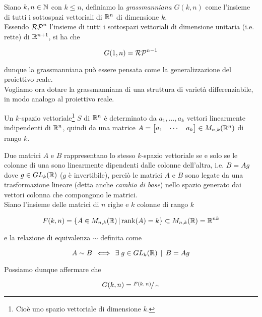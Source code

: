 Siano $ k,n \in \mathbb{N} $ con $ k \leqslant n $, definiamo la \textit{grassmanniana} $ G(k,n) $ come l'insieme di tutti i sottospazi vettoriali di $ \mathbb{R}^{n} $ di dimensione $ k $.\\
Essendo $ \mathcal{RP}^{n} $ l'insieme di tutti i sottospazi vettoriali di dimensione unitaria (i.e. rette) di $ \mathbb{R}^{n+1} $, si ha che

\begin{equation}
	G(1,n) = \mathcal{RP}^{n-1}
\end{equation}

dunque la grassmanniana può essere pensata come la generalizzazione del proiettivo reale.\\
Vogliamo ora dotare la grassmanniana di una struttura di varietà differenziabile, in modo analogo al proiettivo reale.

\begin{remark}
	Un $ k $-spazio vettoriale\footnote{%
		Cioè uno spazio vettoriale di dimensione $ k $.%
	} $ S $ di $ \mathbb{R}^{n} $ è determinato da $ a_{1},\dots,a_{k} $ vettori linearmente indipendenti di $ \mathbb{R}^{n} $, quindi da una matrice $ A = \bmqty{ a_{1} & \cdots & a_{k} } \in M_{n,k}(\R^{n}) $ di rango $ k $.
\end{remark}

Due matrici $ A $ e $ B $ rappresentano lo stesso $ k $-spazio vettoriale se e solo se le colonne di una sono linearmente dipendenti dalle colonne dell'altra, i.e. $ B = A g $ dove $ g \in GL_{k}(\mathbb{R}) $ ($ g $ è invertibile), perciò le matrici $ A $ e $ B $ sono legate da una trasformazione lineare (detta anche \textit{cambio di base}) nello spazio generato dai vettori colonna che compongono le matrici.\\
Siano l'insieme delle matrici di $ n $ righe e $ k $ colonne di rango $ k $

\begin{equation}
	F(k,n) = \left\{ A \in M_{n,k}(\mathbb{R}) \, \middle| \, \rank(A) = k \right\} \subset M_{n,k}(\mathbb{R}) = \mathbb{R}^{nk}
\end{equation}

e la relazione di equivalenza $ \sim $ definita come

\begin{equation}
	A \sim B \, \iff \, \exists \; g \in GL_{k}(\mathbb{R}) \, \mid \, B = A g
\end{equation}

Possiamo dunque affermare che

\begin{equation}
	G(k,n) = \sfrac{F(k,n)}{\sim}
\end{equation}

